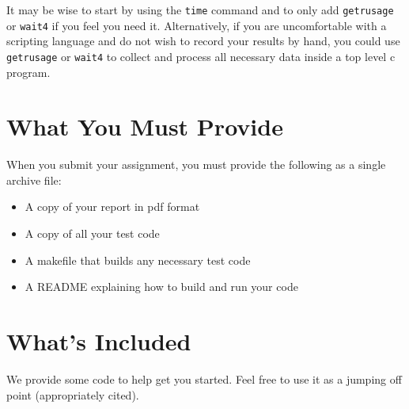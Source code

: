 \documentclass[12pt]{article}
\begin{document}
It may be wise to start by
using the \texttt{time} command and to only add \texttt{getrusage} or
\texttt{wait4} if you feel you need it. Alternatively, if you are
uncomfortable with a scripting language and do not wish to record your
results by hand, you could use \texttt{getrusage} or \texttt{wait4} to
collect and process all necessary data inside a top level c program.

\section{What You Must Provide}

When you submit your assignment, you must provide the following as a
single archive file:
\begin{itemize}
\item A copy of your report in pdf format
\item A copy of all your test code
\item A makefile that builds any necessary test code
\item A README explaining how to build and run your code
\end{itemize}

\section{What's Included}

We provide some code to help get you started. Feel free to use it as a
jumping off point (appropriately cited).
\end{document}
